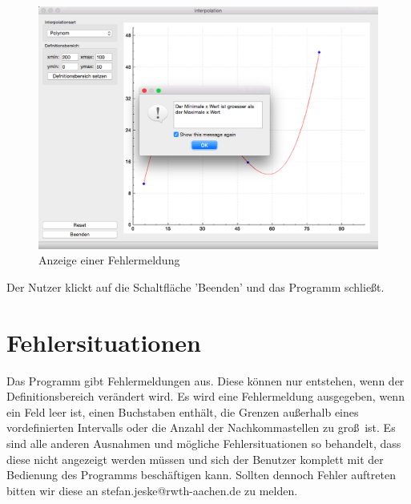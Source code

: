 \begin{figure}[H]
\centering
\includegraphics[width=\textwidth]{figures/error_message_screen.eps}
\caption{Anzeige einer Fehlermeldung}
\end{figure}

\noindent Der Nutzer klickt auf die Schaltfl\"ache 'Beenden' und das Programm schlie\ss t. 

\section{Fehlersituationen}
Das Programm gibt Fehlermeldungen aus. Diese k\"onnen nur entstehen, wenn der Definitionsbereich ver\"andert wird. Es wird eine Fehlermeldung ausgegeben, wenn ein Feld leer ist, einen Buchstaben enth\"alt, die Grenzen au\ss erhalb eines vordefinierten Intervalls oder die Anzahl der Nachkommastellen zu gro\ss \ ist. Es sind alle anderen Ausnahmen und m\"ogliche Fehlersituationen so behandelt, dass diese nicht angezeigt werden m\"ussen und sich der Benutzer komplett mit der Bedienung des Programms besch\"aftigen kann. Sollten dennoch Fehler auftreten bitten wir diese an stefan.jeske@rwth-aachen.de zu melden. 





